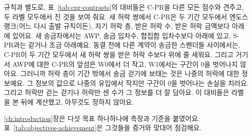 규칙과 별도로, 표~\ref{tab:cpr-contrasts}의 대비들은 \mbox{C-PR}을 다른 모든 점수와 견주고, 두 라벨 모두에서 진 것을 보여 줘요. 새 허락 쌍에서 \mbox{C-PR}은 두 기간 모두에서 엔도스랭크(어느 다시 출발 규칙이든), 자기 허락 층, 받은 허락 수, 받은 허락 금액보다 아래에 있어요. 새 송금자에서는 AWP, 송금 입차수, 합집합 입차수보다 아래에 있고, \mbox{S-PR}과는 같거나 조금 아래예요. 동결 전에 다른 계약이 송금한 스펜더들 사이에서는, \mbox{C-PR}이 두 기간 모두에서 새 허락 쌍을 받은 허락 수보다 위에 줄 세워요. 그리고 거기서 AWP에 대한 \mbox{C-PR}의 앞섬은 W0에서 더 작고, W1에서는 구간이 0을 벗어나지 않아요. 그러니까 허락 층이 기간 밖에서 송금 걷기에 보태는 것은 나중의 허락에 대한 정보예요. 그 정보의 값으로 나중의 유입에서 작지만 구간이 0을 벗어나는 손실을 치러요. 그리고 허락만 걷는 걷기나 허락만 센 수가 그 정보를 더 잘 담아요. 이 대비들은 라벨을 본 뒤에 계산했고, 아무것도 정하지 않아요.


\ref{ch:introduction}장은 다섯 목표 하나하나에 측정과 기준을 붙였어요. 표~\ref{tab:objectives-achievement}은 그것들을 증거와 맞대어 점검해요.

